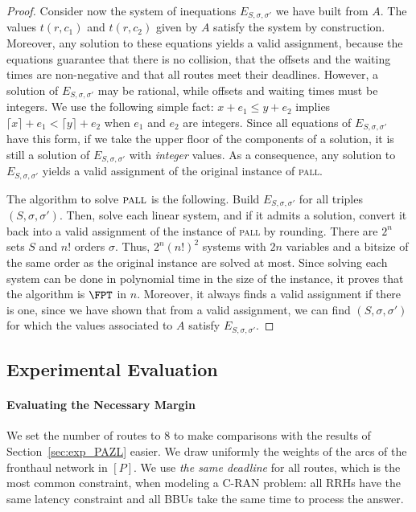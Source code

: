 \documentclass[a4paper,10pt]{journal}
\newcommand\pall{\textsc{pall}\xspace}
\begin{document}
\begin{proof}
Consider now the system of inequations $E_{S,\sigma,\sigma'}$ we have built from $A$.
The values $t(r,c_1)$ and $t(r,c_2)$ given by $A$ satisfy the system by construction. 
Moreover, any solution to these equations yields a valid assignment, because the equations guarantee 
that there is no collision, that the offsets and the waiting times are non-negative and that all routes meet their deadlines. However, a solution of $E_{S,\sigma,\sigma'}$ may be rational, while offsets and waiting times must be integers. We use the following simple fact: $x + e_1 \leq y + e_2$ implies $\lceil x \rceil + e_1 < \lceil y \rceil + e_2$ when $e_1$ and $e_2$ are integers. Since all equations of $E_{S,\sigma,\sigma'}$ have this form, if we take the upper floor of the components of a solution, it is still a solution of $E_{S,\sigma,\sigma'}$ with \emph{integer} values. As a consequence, any solution to $E_{S,\sigma,\sigma'}$ yields a valid assignment of the original instance of \pall.

The algorithm to solve $\pall$ is the following. Build $E_{S,\sigma,\sigma'}$ for all triples $(S,\sigma,\sigma')$. Then, solve each linear system, and if it admits a solution, convert it back into a
valid assignment of the instance of \pall by rounding. There are $2^n$ sets $S$ and $n!$ orders $\sigma$. Thus, $2^n(n!)^2$ systems with $2n$ variables and a bitsize of the same order as the original instance are solved at most. Since solving each system can be done in polynomial time in the size of the instance, it proves that the algorithm is $\FPT$ in $n$. Moreover, it always finds a valid assignment if there is one, since we have shown that from a valid assignment, we can find $(S,\sigma,\sigma')$ for which the values associated to $A$ satisfy $E_{S,\sigma,\sigma'}$.
\end{proof}


    \subsection{Experimental Evaluation}
    \label{sec:resultsPALL}

    \paragraph{Evaluating the Necessary Margin}
    
    We set the number of routes to $8$ to make comparisons with the results of Section~\ref{sec:exp_PAZL} easier. We draw uniformly the weights of the arcs of the fronthaul network in $[P]$. We use \emph{the same deadline} for all routes, which is the most common constraint, when modeling a C-RAN problem: all RRHs have the same latency constraint and all BBUs take the same time to process the answer. 
\end{document}
